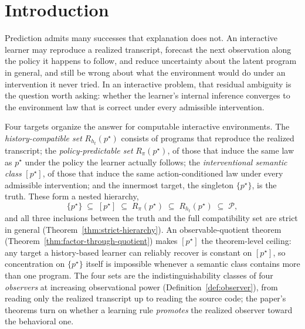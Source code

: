 \documentclass[11pt]{article}
\theoremstyle{definition}
\theoremstyle{remark}
\newcommand{\Pcal}{\mathcal{P}}
\begin{document}
\section{Introduction}
\label{sec:intro}

Prediction admits many successes that explanation does not. An interactive learner may reproduce a realized transcript, forecast the next observation along the policy it happens to follow, and reduce uncertainty about the latent program in general, and still be wrong about what the environment would do under an intervention it never tried. In an interactive problem, that residual ambiguity is the question worth asking: whether the learner's internal inference converges to the environment law that is correct under every admissible intervention.

Four targets organize the answer for computable interactive environments. The \emph{history-compatible set} $R_{h_t}(p^\star)$ consists of programs that reproduce the realized transcript; the \emph{policy-predictable set} $R_\pi(p^\star)$, of those that induce the same law as $p^\star$ under the policy the learner actually follows; the \emph{interventional semantic class} $[p^\star]$, of those that induce the same action-conditioned law under every admissible intervention; and the innermost target, the singleton $\{p^\star\}$, is the truth. These form a nested hierarchy,
\[
\{p^\star\}
\;\subseteq\;
[p^\star]
\;\subseteq\;
R_\pi(p^\star)
\;\subseteq\;
R_{h_t}(p^\star)
\;\subseteq\;
\Pcal,
\]
and all three inclusions between the truth and the full compatibility set are strict in general (Theorem~\ref{thm:strict-hierarchy}). An observable-quotient theorem (Theorem~\ref{thm:factor-through-quotient}) makes $[p^\star]$ the theorem-level ceiling: any target a history-based learner can reliably recover is constant on $[p^\star]$, so concentration on $\{p^\star\}$ itself is impossible whenever a semantic class contains more than one program. The four sets are the indistinguishability classes of four \emph{observers} at increasing observational power (Definition~\ref{def:observer}), from reading only the realized transcript up to reading the source code; the paper's theorems turn on whether a learning rule \emph{promotes} the realized observer toward the behavioral one.
\end{document}

